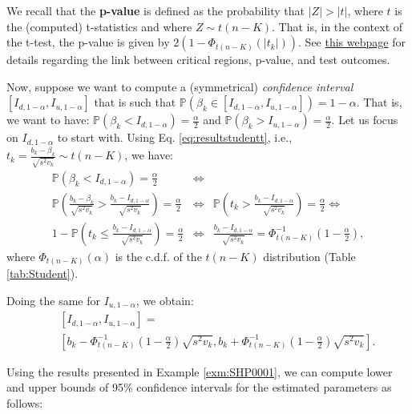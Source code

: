\documentclass[
  12pt,
]{book}
\theoremstyle{definition}
\theoremstyle{definition}
\theoremstyle{definition}
\theoremstyle{definition}
\theoremstyle{remark}
\begin{document}
We recall that the \textbf{p-value} is defined as the probability that \(|Z| > |t|\), where \(t\) is the (computed) t-statistics and where \(Z \sim t(n-K)\). That is, in the context of the t-test, the p-value is given by \(2(1 - \Phi_{t(n-K)}(|t_k|))\). See \href{https://jrenne.shinyapps.io/tests/}{this webpage} for details regarding the link between critical regions, p-value, and test outcomes.

Now, suppose we want to compute a (symmetrical) \emph{confidence interval} \([I_{d,1-\alpha},I_{u,1-\alpha}]\) that is such that \(\mathbb{P}(\beta_k \in [I_{d,1-\alpha},I_{u,1-\alpha}])=1-\alpha\). That is, we want to have: \(\mathbb{P}(\beta_k < I_{d,1-\alpha})=\frac{\alpha}{2}\) and \(\mathbb{P}(\beta_k > I_{u,1-\alpha})=\frac{\alpha}{2}\). Let us focus on \(I_{d,1-\alpha}\) to start with. Using Eq. \eqref{eq:resultstudentt}, i.e., \(t_k = \frac{b_k - \beta_k}{\sqrt{s^2v_k}} \sim t(n-K)\), we have:
\begin{eqnarray*}
\mathbb{P}(\beta_k < I_{d,1-\alpha})=\frac{\alpha}{2} &\Leftrightarrow& \\
\mathbb{P}\left(\frac{b_k - \beta_k}{\sqrt{s^2v_k}} > \frac{b_k - I_{d,1-\alpha}}{\sqrt{s^2v_k}}\right)=\frac{\alpha}{2} &\Leftrightarrow& \mathbb{P}\left(t_k > \frac{b_k - I_{d,1-\alpha}}{\sqrt{s^2v_k}}\right)=\frac{\alpha}{2} \Leftrightarrow\\
1 - \mathbb{P}\left(t_k \le \frac{b_k - I_{d,1-\alpha}}{\sqrt{s^2v_k}}\right)=\frac{\alpha}{2} &\Leftrightarrow& \frac{b_k - I_{d,1-\alpha}}{\sqrt{s^2v_k}} = \Phi^{-1}_{t(n-K)}\left(1-\frac{\alpha}{2}\right),
\end{eqnarray*}
where \(\Phi_{t(n-K)}(\alpha)\) is the c.d.f. of the \(t(n-K)\) distribution (Table \ref{tab:Student}).

Doing the same for \(I_{u,1-\alpha}\), we obtain:
\begin{eqnarray*}
&&[I_{d,1-\alpha},I_{u,1-\alpha}] =\\
&&\left[b_k - \Phi^{-1}_{t(n-K)}\left(1-\frac{\alpha}{2}\right)\sqrt{s^2v_k},b_k + \Phi^{-1}_{t(n-K)}\left(1-\frac{\alpha}{2}\right)\sqrt{s^2v_k}\right].
\end{eqnarray*}

Using the results presented in Example \ref{exm:SHP0001}, we can compute lower and upper bounds of 95\% confidence intervals for the estimated parameters as follows:
\end{document}
